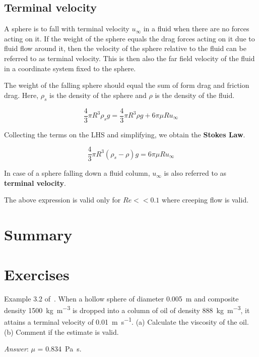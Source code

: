 \subsection{Terminal velocity}

A sphere is to fall with terminal velocity $u_\infty$ in a fluid when there are no forces acting on it. If the weight of the sphere equals the drag forces acting on it due to fluid flow around it, then the velocity of the sphere relative to the fluid can be referred to as terminal velocity. This is then also the far field velocity of the fluid in a coordinate system fixed to the sphere.

The weight of the falling sphere should equal the sum of form drag and friction
drag. Here, $\rho_s$ is the density of the sphere and $\rho$ is the density of the fluid.

$$\frac{4}{3} \pi R^3 \rho_s g = \frac{4}{3} \pi R^3 \rho g + 6 \pi \mu R
u_\infty $$

Collecting the terms on the LHS and simplifying, we obtain the  {\bf Stokes Law}. 


$$\boxed{ \frac{4}{3} \pi R^3 \left( \rho_s - \rho \right) g = 6 \pi \mu R
u_\infty }$$


In case of a sphere falling down a fluid column, $u_\infty$ is also referred to as {\bf terminal velocity}.

The above expression is valid only for $Re << 0.1$ where creeping flow is valid.


\section{Summary}





\section{Exercises}


\begin{question}
Example 3.2 of~\cite{gaskell}. When a hollow sphere of diameter \SI{0.005}{\metre} and composite density \SI{1500}{\kilo\gram\per\metre\cubed} is dropped into a column of oil of density \SI{888}{\kilo\gram\per\metre\cubed}, it attains a terminal velocity of \SI{0.01}{\metre\per\second}. (a) Calculate the viscosity of the oil. (b) Comment if the estimate is valid.
\end{question}
\begin{solution}[print]
{\it Answer}: $\mu$ = \SI{0.834}{\pascal\second}.
\end{solution}

